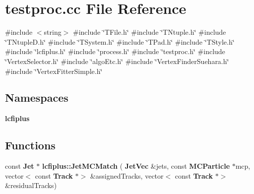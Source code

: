 \section{testproc.\+cc File Reference}
\label{testproc_8cc}
{\ttfamily \#include $<$string$>$}\newline
{\ttfamily \#include \char`\"{}T\+File.\+h\char`\"{}}\newline
{\ttfamily \#include \char`\"{}T\+Ntuple.\+h\char`\"{}}\newline
{\ttfamily \#include \char`\"{}T\+Ntuple\+D.\+h\char`\"{}}\newline
{\ttfamily \#include \char`\"{}T\+System.\+h\char`\"{}}\newline
{\ttfamily \#include \char`\"{}T\+Pad.\+h\char`\"{}}\newline
{\ttfamily \#include \char`\"{}T\+Style.\+h\char`\"{}}\newline
{\ttfamily \#include \char`\"{}lcfiplus.\+h\char`\"{}}\newline
{\ttfamily \#include \char`\"{}process.\+h\char`\"{}}\newline
{\ttfamily \#include \char`\"{}testproc.\+h\char`\"{}}\newline
{\ttfamily \#include \char`\"{}Vertex\+Selector.\+h\char`\"{}}\newline
{\ttfamily \#include \char`\"{}algo\+Etc.\+h\char`\"{}}\newline
{\ttfamily \#include \char`\"{}Vertex\+Finder\+Suehara.\+h\char`\"{}}\newline
{\ttfamily \#include \char`\"{}Vertex\+Fitter\+Simple.\+h\char`\"{}}\newline
\subsection*{Namespaces}
\begin{DoxyCompactItemize}
\item 
 \textbf{ lcfiplus}
\end{DoxyCompactItemize}
\subsection*{Functions}
\begin{DoxyCompactItemize}
\item 
const \textbf{ Jet} $\ast$ \textbf{ lcfiplus\+::\+Jet\+M\+C\+Match} (\textbf{ Jet\+Vec} \&jets, const \textbf{ M\+C\+Particle} $\ast$mcp, vector$<$ const \textbf{ Track} $\ast$$>$ \&assigned\+Tracks, vector$<$ const \textbf{ Track} $\ast$$>$ \&residual\+Tracks)
\end{DoxyCompactItemize}
